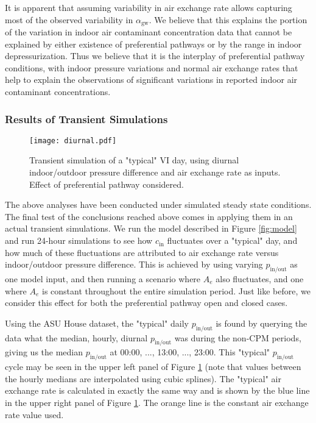 \documentclass[journal=esthag,manuscript=article]{achemso}
\begin{document}
It is apparent that assuming variability in air exchange rate allows capturing most of the observed variability in $\alpha_\mathrm{gw}$.
We believe that this explains the portion of the variation in indoor air contaminant concentration data that cannot be explained by either existence of preferential pathways or by the range in indoor depressurization.
Thus we believe that it is the interplay of preferential pathway conditions, with indoor pressure variations and normal air exchange rates that help to explain the observations of significant variations in reported indoor air contaminant concentrations.

\subsubsection{Results of Transient Simulations}

\begin{figure}
 \caption{Transient simulation of a "typical" VI day, using diurnal indoor/outdoor pressure difference and air exchange rate as inputs. Effect of preferential pathway considered.}\label{fig:diurnal}
 \texttt{[image: diurnal.pdf]}
\end{figure}

The above analyses have been conducted under simulated steady state conditions.
The final test of the conclusions reached above comes in applying them in an actual transient simulations.
We run the model described in Figure \ref{fig:model} and run 24-hour simulations to see how $c_\mathrm{in}$ fluctuates over a "typical" day, and how much of these fluctuations are attributed to air exchange rate versus indoor/outdoor pressure difference.
This is achieved by using varying $p_\mathrm{in/out}$ as one model input, and then running a scenario where $A_e$ also fluctuates, and one where $A_e$ is constant throughout the entire simulation period.
Just like before, we consider this effect for both the preferential pathway open and closed cases.

Using the ASU House dataset, the "typical" daily $p_\mathrm{in/out}$ is found by querying the data what the median, hourly, diurnal $p_\mathrm{in/out}$ was during the non-CPM periods, giving us the median $p_\mathrm{in/out}$ at 00:00, ..., 13:00, ..., 23:00.
This "typical" $p_\mathrm{in/out}$ cycle may be seen in the upper left panel of Figure \ref{fig:diurnal} (note that values between the hourly medians are interpolated using cubic splines).
The "typical" air exchange rate is calculated in exactly the same way and is shown by the blue line in the upper right panel of Figure \ref{fig:diurnal}.
The orange line is the constant air exchange rate value used.
\end{document}
